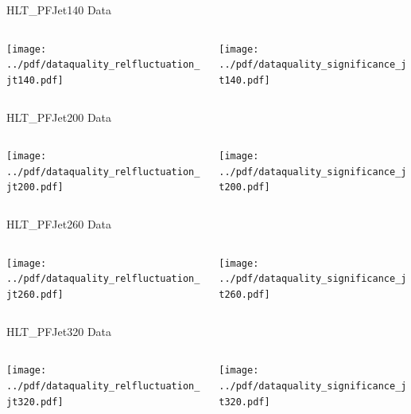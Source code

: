\documentclass[9pt]{beamer}
\begin{document}
\begin{frame}[t]{HLT\_PFJet140 Data}
\begin{columns}[T]
  \begin{column}{.5\textwidth}
  \texttt{[image: ../pdf/dataquality\_relfluctuation\_jt140.pdf]}
  \end{column}
  \begin{column}{.5\textwidth}
  \texttt{[image: ../pdf/dataquality\_significance\_jt140.pdf]}
  \end{column}
\end{columns}
\end{frame}

\begin{frame}[t]{HLT\_PFJet200 Data}
\begin{columns}[T]
  \begin{column}{.5\textwidth}
  \texttt{[image: ../pdf/dataquality\_relfluctuation\_jt200.pdf]}
  \end{column}
  \begin{column}{.5\textwidth}
  \texttt{[image: ../pdf/dataquality\_significance\_jt200.pdf]}
  \end{column}
\end{columns}
\end{frame}

\begin{frame}[t]{HLT\_PFJet260 Data}
\begin{columns}[T]
  \begin{column}{.5\textwidth}
  \texttt{[image: ../pdf/dataquality\_relfluctuation\_jt260.pdf]}
  \end{column}
  \begin{column}{.5\textwidth}
  \texttt{[image: ../pdf/dataquality\_significance\_jt260.pdf]}
  \end{column}
\end{columns}
\end{frame}

\begin{frame}[t]{HLT\_PFJet320 Data}
\begin{columns}[T]
  \begin{column}{.5\textwidth}
  \texttt{[image: ../pdf/dataquality\_relfluctuation\_jt320.pdf]}
  \end{column}
  \begin{column}{.5\textwidth}
  \texttt{[image: ../pdf/dataquality\_significance\_jt320.pdf]}
  \end{column}
\end{columns}
\end{frame}
\end{document}
